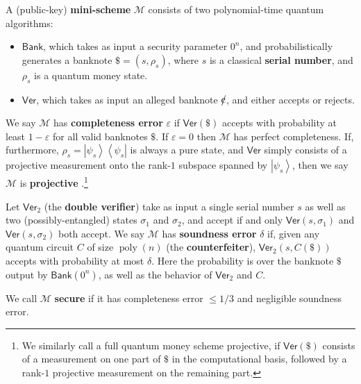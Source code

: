 \begin{definition}
\label{minischeme}A (public-key)\textbf{ mini-scheme}
$\mathcal{M}$ consists of two polynomial-time quantum algorithms:

\begin{itemize}
\item $\mathsf{Bank}$, which takes as input a security parameter $0^{n}$, and
probabilistically generates a banknote $\$=\left(  s,\rho_{s}\right)  $, where
$s$ is a classical \textbf{serial number}, and $\rho_{s}$ is a quantum money state.

\item $\mathsf{Ver}$, which takes as input an alleged banknote $%
%
%
\hbox{\rm\rlap/c}%
%
$, and either accepts or rejects.
\end{itemize}

We say $\mathcal{M}$ has \textbf{completeness error} $\varepsilon$ if
$\mathsf{Ver}\left(  \$\right)  $ accepts with probability at least
$1-\varepsilon$ for all valid banknotes $\$$. If $\varepsilon=0$ then
$\mathcal{M}$ has perfect completeness. If, furthermore, $\rho
_{s}=\left\vert \psi_{s}\right\rangle \left\langle \psi_{s}\right\vert $ is
always a pure state, and $\mathsf{Ver}$ simply consists of a projective
measurement onto the rank-$1$ subspace spanned by $\left\vert \psi
_{s}\right\rangle $, then we say $\mathcal{M}$ is \textbf{projective}%
.\footnote{We similarly call a full quantum money scheme projective, if
$\mathsf{Ver}\left(  \$\right)  $ consists of a measurement on one part of
$\$$ in the computational basis, followed by a rank-$1$ projective measurement
on the remaining part.}

Let $\mathsf{Ver}_{2}$ (the \textbf{double verifier}) take as input a single
serial number $s$ as well as two (possibly-entangled) states $\sigma_{1}$ and
$\sigma_{2}$, and accept if and only $\mathsf{Ver}\left(  s,\sigma_{1}\right)
$ and $\mathsf{Ver}\left(  s,\sigma_{2}\right)  $ both accept. We say
$\mathcal{M}$ has \textbf{soundness error} $\delta$ if, given any quantum
circuit $C$ of size $\operatorname*{poly}\left(  n\right)  $ (the
\textbf{counterfeiter}), $\mathsf{Ver}_{2}\left(  s,C\left(  \$\right)
\right)  $ accepts with probability at most $\delta$. Here the probability
is over the banknote $\$$ output by $\mathsf{Bank}\left(  0^{n}\right)  $, as
well as the behavior of $\mathsf{Ver}_{2}$ and $C$.

We call $\mathcal{M}$ \textbf{secure} if it has completeness error $\leq
1/3$ and negligible soundness error.{}
\end{definition}

